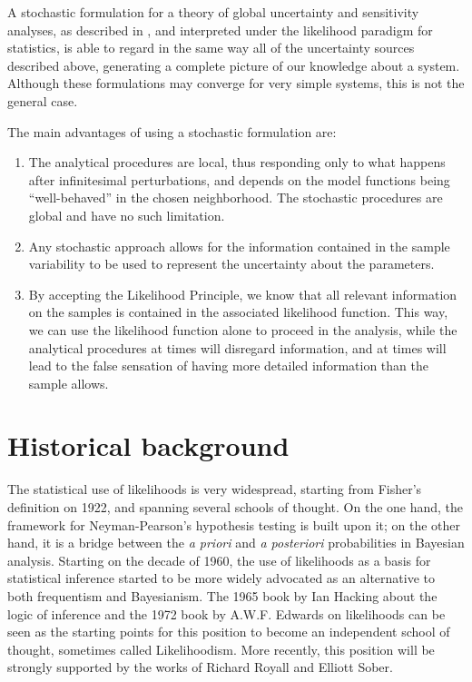 \documentclass[twoside,12pt,a4paper]{article}
\begin{document}
A stochastic formulation for a theory of global uncertainty and sensitivity analyses, as described in 
\citep{Chalom12}, and interpreted under the likelihood paradigm for statistics, is able to regard
in the same way all of the uncertainty sources described above, generating a complete picture of our
knowledge about a system. Although these formulations may converge for very simple systems, this is not
the general case. 

The main advantages of using a stochastic formulation are:

\begin{enumerate}
  \item The analytical procedures are local, thus responding only to what happens after infinitesimal
    perturbations, and depends on the model functions being ``well-behaved'' in the chosen neighborhood.
    The stochastic procedures are global and have no such limitation.
  \item Any stochastic approach allows for the information contained in the sample variability to be used
    to represent the uncertainty about the parameters.
  \item By accepting the Likelihood Principle, we know that all relevant information on the samples is
    contained in the associated likelihood function. This way, we can use the likelihood function alone
    to proceed in the analysis, while the analytical procedures at times will disregard information, and
    at times will lead to the false sensation of having more detailed information than the sample allows.
\end{enumerate}

\section{Historical background}\label{sec:likelihood}

The statistical use of likelihoods is very widespread, starting from Fisher's definition on 1922, and
spanning several schools of thought. 
On the one hand, the framework for Neyman-Pearson's hypothesis testing is built upon it; on the other hand,
it is a bridge between the {\em a priori} and {\em a posteriori} probabilities in Bayesian analysis. 
Starting on the decade of 1960, the use of likelihoods as a basis for statistical inference started to be
more widely advocated as an alternative to both frequentism and Bayesianism. The 1965 book by Ian Hacking 
about the logic of inference and the 1972 book by A.W.F. Edwards on likelihoods can be seen as the starting
points for this position to become an independent school of thought, sometimes called Likelihoodism.
More recently, this position will be strongly supported by the works of Richard Royall and Elliott Sober.
\end{document}
